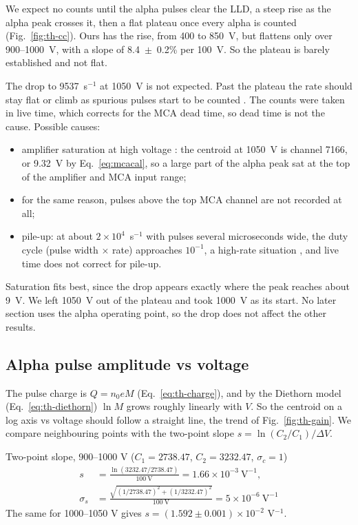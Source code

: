 \documentclass[12pt]{article}
\begin{document}
We expect no counts until the alpha pulses clear the LLD, a steep rise as the alpha peak crosses it, then a flat plateau once every alpha is counted (Fig.~\ref{fig:th-cc}). Ours has the rise, from 400 to 850~V, but flattens only over 900--1000~V, with a slope of 8.4~$\pm$~0.2\% per 100~V. So the plateau is barely established and not flat.

The drop to 9537~s$^{-1}$ at 1050~V is not expected. Past the plateau the rate should stay flat or climb as spurious pulses start to be counted \cite{knoll}. The counts were taken in live time, which corrects for the MCA dead time, so dead time is not the cause. Possible causes:
\begin{itemize}
\item amplifier saturation at high voltage \cite{labmanual}: the centroid at 1050~V is channel 7166, or 9.32~V by Eq.~\ref{eq:mcacal}, so a large part of the alpha peak sat at the top of the amplifier and MCA input range;
\item for the same reason, pulses above the top MCA channel are not recorded at all;
\item pile-up: at about $2\times10^4$~s$^{-1}$ with pulses several microseconds wide, the duty cycle (pulse width $\times$ rate) approaches $10^{-1}$, a high-rate situation \cite{knoll}, and live time does not correct for pile-up.
\end{itemize}
Saturation fits best, since the drop appears exactly where the peak reaches about 9~V. We left 1050~V out of the plateau and took 1000~V as its start. No later section uses the alpha operating point, so the drop does not affect the other results.

\subsection{Alpha pulse amplitude vs voltage}
\label{sec:amp}

The pulse charge is $Q = n_0 e M$ (Eq.~\ref{eq:th-charge}), and by the Diethorn model (Eq.~\ref{eq:th-diethorn}) $\ln M$ grows roughly linearly with $V$. So the centroid on a log axis vs voltage should follow a straight line, the trend of Fig.~\ref{fig:th-gain}. We compare neighbouring points with the two-point slope $s = \ln(C_2/C_1)/\Delta V$.

\begin{samplecalc}{Two-point slope, 900--1000 V ($C_1 = 2738.47$, $C_2 = 3232.47$, $\sigma_c = 1$)}
\begin{align*}
s &= \frac{\ln(3232.47/2738.47)}{100\ \text{V}} = 1.66\times10^{-3}\ \text{V}^{-1},\\
\sigma_s &= \frac{\sqrt{(1/2738.47)^2 + (1/3232.47)^2}}{100\ \text{V}} = 5\times10^{-6}\ \text{V}^{-1}
\end{align*}
The same for 1000--1050 V gives $s = (1.592 \pm 0.001)\times10^{-2}$ V$^{-1}$.
\end{samplecalc}
\end{document}
